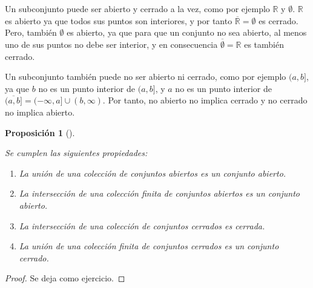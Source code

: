 \documentclass[
  a4paper,
]{scrreport}
\providecommand{\tightlist}{%
  \setlength{\itemsep}{0pt}\setlength{\parskip}{0pt}}\usepackage{longtable,booktabs,array}
\theoremstyle{definition}
\theoremstyle{plain}
\theoremstyle{definition}
\theoremstyle{definition}
\theoremstyle{plain}
\theoremstyle{plain}
\newtheorem{proposition}{Proposición}[chapter]
\theoremstyle{remark}
\begin{document}
\begin{tcolorbox}[enhanced jigsaw, leftrule=.75mm, colbacktitle=quarto-callout-warning-color!10!white, toprule=.15mm, opacityback=0, opacitybacktitle=0.6, toptitle=1mm, breakable, bottomtitle=1mm, colframe=quarto-callout-warning-color-frame, rightrule=.15mm, titlerule=0mm, title=\textcolor{quarto-callout-warning-color}{\faExclamationTriangle}\hspace{0.5em}{Advertencia}, arc=.35mm, left=2mm, bottomrule=.15mm, colback=white, coltitle=black]

Un subconjunto puede ser abierto y cerrado a la vez, como por ejemplo
\(\mathbb{R}\) y \(\emptyset\). \(\mathbb{R}\) es abierto ya que todos
sus puntos son interiores, y por tanto
\(\overline{\mathbb{R}}=\emptyset\) es cerrado. Pero, también
\(\emptyset\) es abierto, ya que para que un conjunto no sea abierto, al
menos uno de sus puntos no debe ser interior, y en consecuencia
\(\overline{\emptyset}=\mathbb{R}\) es también cerrado.

Un subconjunto también puede no ser abierto ni cerrado, como por ejemplo
\((a,b]\), ya que \(b\) no es un punto interior de \((a,b]\), y \(a\) no
es un punto interior de \(\overline{(a,b]}=(-\infty,a]\cup (b,\infty)\).
Por tanto, no abierto no implica cerrado y no cerrado no implica
abierto.

\end{tcolorbox}

\begin{proposition}[]\protect\hypertarget{prp-union-interseccion-conjuntos-abiertos-cerrados}{}\label{prp-union-interseccion-conjuntos-abiertos-cerrados}

Se cumplen las siguientes propiedades:

\begin{enumerate}
\def\labelenumi{\arabic{enumi}.}
\tightlist
\item
  La unión de una colección de conjuntos abiertos es un conjunto
  abierto.
\item
  La intersección de una colección finita de conjuntos abiertos es un
  conjunto abierto.
\item
  La intersección de una colección de conjuntos cerrados es cerrada.
\item
  La unión de una colección finita de conjuntos cerrados es un conjunto
  cerrado.
\end{enumerate}

\end{proposition}

\begin{tcolorbox}[enhanced jigsaw, leftrule=.75mm, colbacktitle=quarto-callout-note-color!10!white, toprule=.15mm, opacityback=0, opacitybacktitle=0.6, toptitle=1mm, breakable, bottomtitle=1mm, colframe=quarto-callout-note-color-frame, rightrule=.15mm, titlerule=0mm, title=\textcolor{quarto-callout-note-color}{\faInfo}\hspace{0.5em}{Demostración}, arc=.35mm, left=2mm, bottomrule=.15mm, colback=white, coltitle=black]

\begin{proof}
Se deja como ejercicio.
\end{proof}

\end{tcolorbox}
\end{document}
